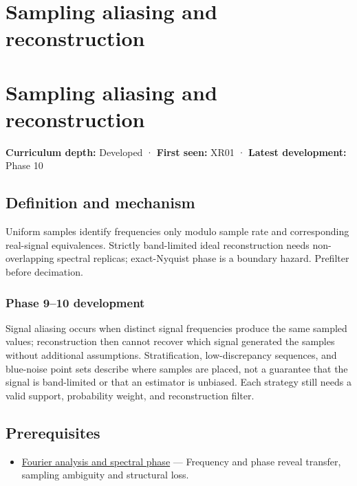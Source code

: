 \hypertarget{appendix-6a7869dd79a6}{}
\section*{Sampling aliasing and reconstruction}
\section{Sampling aliasing and reconstruction}\label{appendix-6a7869dd79a6-sampling-aliasing-and-reconstruction}

\textbf{Curriculum depth:} Developed · \textbf{First seen:} XR01 · \textbf{Latest development:} Phase 10

\subsection{Definition and mechanism}\label{appendix-6a7869dd79a6-definition-and-mechanism}

Uniform samples identify frequencies only modulo sample rate and corresponding real-signal equivalences. Strictly band-limited ideal reconstruction needs non-overlapping spectral replicas; exact-Nyquist phase is a boundary hazard. Prefilter before decimation.

\subsubsection{Phase 9--10 development}\label{appendix-6a7869dd79a6-phase-910-development}

Signal aliasing occurs when distinct signal frequencies produce the same sampled values; reconstruction then cannot recover which signal generated the samples without additional assumptions. Stratification, low-discrepancy sequences, and blue-noise point sets describe where samples are placed, not a guarantee that the signal is band-limited or that an estimator is unbiased. Each strategy still needs a valid support, probability weight, and reconstruction filter.

\subsection{Prerequisites}\label{appendix-6a7869dd79a6-prerequisites}

\begin{itemize}
\tightlist
\item
  \hyperref[appendix-b60686ba06a1]{Fourier analysis and spectral phase} --- Frequency and phase reveal transfer, sampling ambiguity and structural loss.
\end{itemize}

